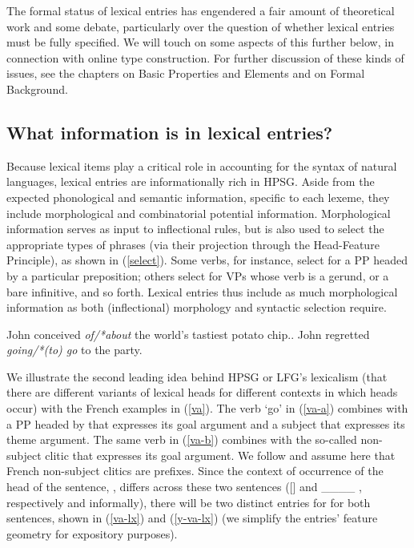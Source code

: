 \documentclass[output=paper]{langsci/langscibook}
\begin{document}
The formal status of lexical entries has engendered a fair amount of theoretical work and some debate, particularly over the question of whether lexical entries must be fully specified.
We will touch on some aspects of this further below, in connection with online type construction.
For further discussion of these kinds of issues, see the chapters on Basic Properties and Elements and on Formal Background.


\subsection{What information is in lexical entries?}

Because lexical items play a critical role in accounting for the syntax of natural languages, lexical entries are informationally rich in HPSG. Aside from the expected phonological and semantic information, specific to each lexeme, they include morphological and combinatorial potential information. Morphological information serves as input to inflectional rules, but is also used to select the appropriate types of phrases (via their projection through the Head-Feature Principle), as shown in (\ref{select}). Some verbs, for instance, select for a PP headed by a particular preposition; others select for VPs whose verb is a gerund, or a bare infinitive, and so forth. Lexical entries thus include as much morphological information as both (inflectional) morphology and syntactic selection require.

\begin{exe}
	\ex\label{select}
	\begin{xlist}
		\ex\label{select-a}John conceived \emph{of/*about} the world's tastiest potato chip..
		\ex\label{select-b} John regretted \emph{going/*(to) go} to the party.
	\end{xlist}
\end{exe} 


We illustrate the second leading idea behind HPSG or LFG's lexicalism (that there are different variants of lexical heads for different contexts in which heads occur) with the French examples in (\ref{va}). The verb  `go' in (\ref{va-a}) combines with a PP headed by  that expresses its goal argument and a subject that expresses its theme argument. The same verb in (\ref{va-b}) combines with the so-called non-subject clitic  that expresses its goal argument. We follow \citet{MillerandSag1997} and assume here that French non-subject clitics are prefixes. Since the context of occurrence of the head of the sentence, , differs across these two sentences ([] and  \_\_\_\_ , respectively and informally), there will be two distinct entries for  for both sentences, shown in (\ref{va-lx}) and (\ref{y-va-lx}) (we simplify the entries' feature geometry for expository purposes).
\end{document}
